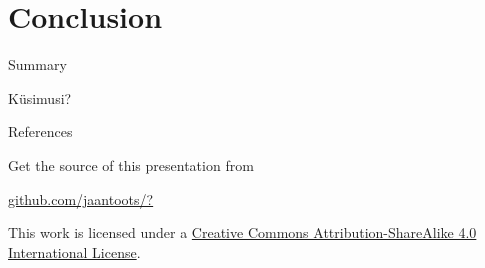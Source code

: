 \documentclass{beamer}
\begin{document}
\begin{frame}{}
  \begin{block}{}
  \end{block}
\end{frame}

\section{Conclusion}

\begin{frame}{Summary}

\end{frame}

\begin{frame}[standout]
  Küsimusi?
\end{frame}

\appendix

\begin{frame}[allowframebreaks]{References}

  
  

\end{frame}

\begin{frame}[plain]
  Get the source of this presentation from

  \begin{center}
    \href{https://github.com/jaantoots/?}{github.com/jaantoots/?}
  \end{center}

  This work is licensed under a
  \href{http://creativecommons.org/licenses/by-sa/4.0/}{Creative
    Commons Attribution-ShareAlike 4.0 International License}.

  \begin{center}\ccbysa\end{center}
\end{frame}
\end{document}
